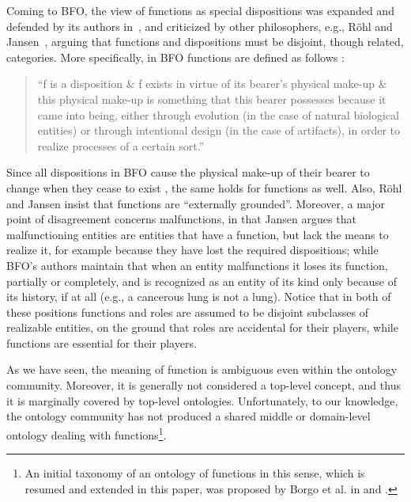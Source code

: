 \documentclass[sw]{iosart2x}
\newcommand{\BFO}{\textsc{BFO}\xspace}
\newcommand{\qquotes}[1]{``#1''}
\begin{document}
Coming to \BFO, the view of functions as special dispositions was expanded and defended by its authors in~\cite{arpFunctionRoleDisposition2008,spearFunctionsBasicFormal2016}, and criticized by other philosophers, e.g., Röhl and Jansen~\cite{rohlWhyFunctionsAre2014,jansenFunctionsMalfunctioningNegative2018}, 
arguing that functions and dispositions must be disjoint, though related, categories. 
More specifically, in \BFO functions are defined as follows \cite{spearFunctionsBasicFormal2016}:
\begin{quote}
  \qquotes{f is a disposition \& f exists in virtue of its bearer’s physical make-up \& this physical make-up is something that this bearer possesses because it came into being, either through evolution (in the case of natural biological entities) or through intentional design (in the case of artifacts), in order to realize processes of a certain sort.}
\end{quote} 
Since all dispositions in \BFO cause the physical make-up of their bearer to change when they cease to exist \cite{spearFunctionsBasicFormal2016}, the same holds for functions as well.
Also, Röhl and Jansen insist that functions are \qquotes{externally grounded}.
Moreover, a major point of disagreement concerns malfunctions, in that Jansen argues that malfunctioning entities are entities that have a function, but lack the means to realize it, for example because they have lost the required dispositions; while \BFO's authors maintain that when an entity malfunctions it loses its function, partially or completely, and is recognized as an entity of its kind only because of its history, if at all (e.g., a cancerous lung is not a lung).
Notice that in both of these positions functions and roles are assumed to be disjoint subclasses of realizable entities, on the ground that roles are  accidental for their players, while functions are essential for their players.




As we have seen, 
the meaning of function is ambiguous even within the ontology community. 
Moreover, it is generally not considered a top-level concept, and thus it is marginally covered by top-level ontologies. 
Unfortunately, to our knowledge, the ontology community has not produced a shared middle or domain-level ontology dealing with functions\footnote{An initial taxonomy of an ontology of functions in this sense, which is resumed and extended in this paper, was proposed by Borgo et al. in \cite{borgoCapabilitiesCapacitiesFunctionalities2021} and \cite{borgoKnowledgebasedAdaptiveAgents2019}.}. 
\end{document}
